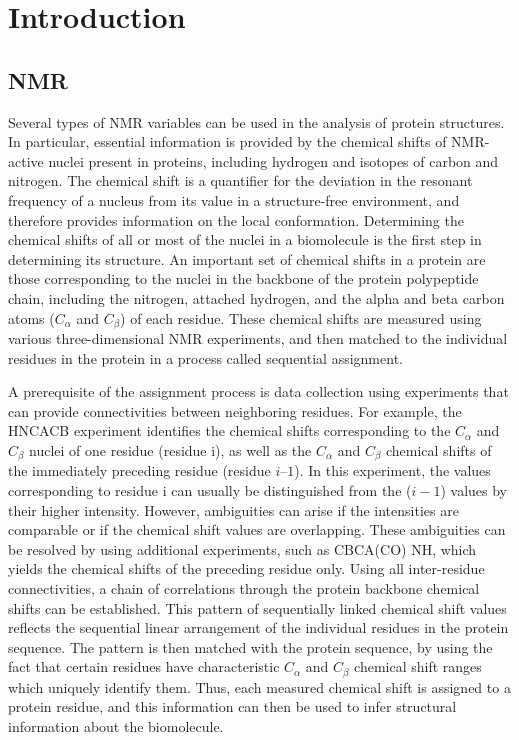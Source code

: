 \documentclass[12pt]{article}
\begin{document}
\section{Introduction}
\label{sub:introduction}

\subsection{NMR} %
\label{sub:nmr}
Several types of NMR variables can be used in the analysis of protein structures. In particular, essential information is provided by the chemical shifts of NMR-active nuclei present in proteins, including hydrogen and isotopes of carbon and nitrogen. The chemical shift is a quantifier for the deviation in the resonant frequency of a nucleus from its value in a structure-free environment, and therefore provides information on the local conformation. Determining the chemical shifts of all or most of the nuclei in a biomolecule is the first step in determining its structure. An important set of chemical shifts in a protein are those corresponding to the nuclei in the backbone of the protein polypeptide chain, including the nitrogen, attached hydrogen, and the alpha and beta carbon atoms ($C_\alpha$ and $C_{\beta}$) of each residue. These chemical shifts are measured using various three-dimensional NMR experiments, and then matched to the individual residues in the protein in a process called sequential assignment.

A prerequisite of the assignment process is data collection using experiments that can provide connectivities between neighboring residues. For example, the HNCACB experiment identifies the chemical shifts corresponding to the $C_\alpha$ and $C_{\beta}$ nuclei of one residue (residue i), as well as the $C_\alpha$ and $C_{\beta}$ chemical shifts of the immediately preceding residue (residue $i – 1$). In this experiment, the values corresponding to residue i can usually be distinguished from the ($i -1$) values by their higher intensity. However, ambiguities can arise if the intensities are comparable or if the chemical shift values are overlapping. These ambiguities can be resolved by using additional experiments, such as CBCA(CO) NH, which yields the chemical shifts of the preceding residue only. Using all inter-residue connectivities, a chain of correlations through the protein backbone chemical shifts can be established.  This pattern of sequentially linked chemical shift values reflects the sequential linear arrangement of the individual residues in the protein sequence. The pattern is then matched with the protein sequence, by using the fact that certain residues have characteristic $C_\alpha$ and $C_{\beta}$ chemical shift ranges which uniquely identify them. Thus, each measured chemical shift is assigned to a protein residue, and this information can then be used to infer structural information about the biomolecule.
\end{document}
